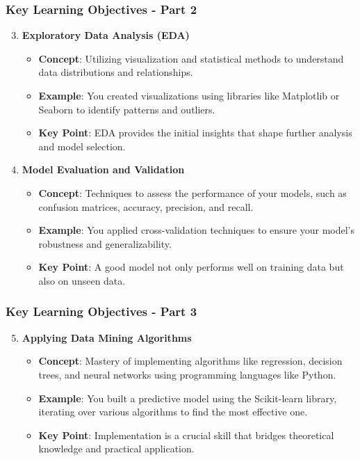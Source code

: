 \documentclass[aspectratio=169]{beamer}
\begin{document}
\begin{frame}[fragile]
    \frametitle{Key Learning Objectives - Part 2}
    \begin{enumerate}
        \setcounter{enumi}{2}
        \item \textbf{Exploratory Data Analysis (EDA)}
        \begin{itemize}
            \item \textbf{Concept}: Utilizing visualization and statistical methods to understand data distributions and relationships.
            \item \textbf{Example}: You created visualizations using libraries like Matplotlib or Seaborn to identify patterns and outliers.
            \item \textbf{Key Point}: EDA provides the initial insights that shape further analysis and model selection.
        \end{itemize}
        
        \item \textbf{Model Evaluation and Validation}
        \begin{itemize}
            \item \textbf{Concept}: Techniques to assess the performance of your models, such as confusion matrices, accuracy, precision, and recall.
            \item \textbf{Example}: You applied cross-validation techniques to ensure your model's robustness and generalizability.
            \item \textbf{Key Point}: A good model not only performs well on training data but also on unseen data.
        \end{itemize}
    \end{enumerate}
\end{frame}

\begin{frame}[fragile]
    \frametitle{Key Learning Objectives - Part 3}
    \begin{enumerate}
        \setcounter{enumi}{4}
        \item \textbf{Applying Data Mining Algorithms}
        \begin{itemize}
            \item \textbf{Concept}: Mastery of implementing algorithms like regression, decision trees, and neural networks using programming languages like Python.
            \item \textbf{Example}: You built a predictive model using the Scikit-learn library, iterating over various algorithms to find the most effective one.
            \item \textbf{Key Point}: Implementation is a crucial skill that bridges theoretical knowledge and practical application.
        \end{itemize}
    \end{enumerate}
\end{frame}
\end{document}
